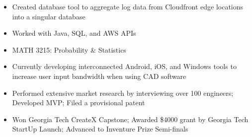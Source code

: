 \documentclass[10pt,letter,ragged2e,withhyper]{altacv}
\begin{document}
\begin{paracol}{2}




\begin{itemize}
\item Created database tool to aggregate log data from Cloudfront edge locations into a singular database
\item Worked with Java, SQL, and AWS APIs
\end{itemize}

\divider

\begin{itemize}
\item MATH 3215: Probability \& Statistics
\end{itemize}




\begin{itemize}
\item Currently developing interconnected Android, iOS, and Windows tools to increase user input bandwidth when using CAD software
\item Performed extensive market research by interviewing over 100 engineers; Developed MVP; Filed a provisional patent
\item Won Georgia Tech CreateX Capstone; Awarded \$4000 grant by Georgia Tech StartUp Launch; Advanced to Inventure Prize Semi-finals
\end{itemize}


\end{paracol}
\end{document}
